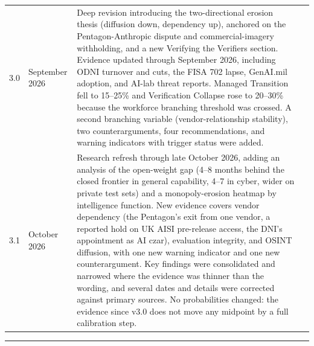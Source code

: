 \documentclass[11pt,letterpaper]{article}
\makeatletter
\newcommand{\etraneed}[1]{\par\if@nobreak\else\penalty\z@\ifdim\pagegoal<\maxdimen\ifdim\dimexpr\pagegoal-\pagetotal\relax<\dimexpr#1\relax\newpage\fi\fi\fi}
\makeatother
\begin{document}
\begin{center}
\footnotesize
\begin{tabularx}{\linewidth}{ZY{0.28}Y{0.51}Y{2.21}}
3.0 &September 2026 & Deep revision introducing the two-directional erosion thesis (diffusion down, dependency up), anchored on the Pentagon-Anthropic dispute and commercial-imagery withholding, and a new Verifying the Verifiers section. Evidence updated through September 2026, including ODNI turnover and cuts, the FISA 702 lapse, GenAI.mil adoption, and AI-lab threat reports. Managed Transition fell to 15--25\% and Verification Collapse rose to 20--30\% because the workforce branching threshold was crossed. A second branching variable (vendor-relationship stability), two counterarguments, four recommendations, and warning indicators with trigger status were added. \\
3.1 & October 2026 & Research refresh through late October 2026, adding an analysis of the open-weight gap (4--8 months behind the closed frontier in general capability, 4--7 in cyber, wider on private test sets) and a monopoly-erosion heatmap by intelligence function. New evidence covers vendor dependency (the Pentagon's exit from one vendor, a reported hold on UK AISI pre-release access, the DNI's appointment as AI czar), evaluation integrity, and OSINT diffusion, with one new warning indicator and one new counterargument. Key findings were consolidated and narrowed where the evidence was thinner than the wording, and several dates and details were corrected against primary sources. No probabilities changed: the evidence since v3.0 does not move any midpoint by a full calibration step. \\
\bottomrule
\end{tabularx}
\end{center}

\etraneed{20\baselineskip}
\begin{center}
\rule{0.6\textwidth}{0.5pt}
\end{center}

\vspace{0.3cm}
\end{document}
